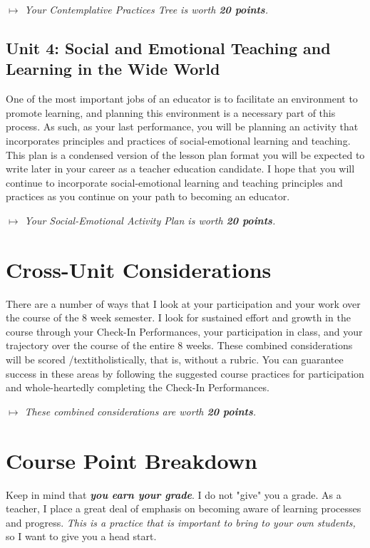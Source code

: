 \documentclass[two-side]{tufte-handout}
\begin{document}
\medskip\noindent\textit{$\mapsto$ Your Contemplative Practices Tree is worth \textbf{20 points}.}

\subsection{Unit 4: Social and Emotional Teaching and Learning in the Wide World}

One of the most important jobs of an educator is to facilitate an environment to promote learning, and planning this environment is a necessary part of this process. As such, as your last performance, you will be planning an activity that incorporates principles and practices of social-emotional learning and teaching. This plan is a condensed version of the lesson plan format you will be expected to write later in your career as a teacher education candidate. I hope that you will continue to incorporate social-emotional learning and teaching principles and practices as you continue on your path to becoming an educator.

\medskip\noindent\textit{$\mapsto$ Your Social-Emotional Activity Plan is worth \textbf{20 points}.}

\section{Cross-Unit Considerations}

There are a number of ways that I look at your participation and your work over the course of the 8 week semester. I look for sustained effort and growth in the course through your Check-In Performances, your participation in class, and your trajectory over the course of the entire 8 weeks. These combined considerations will be scored /textit{holistically}, that is, without a rubric. You can guarantee success in these areas by following the suggested course practices for participation and whole-heartedly completing the Check-In Performances.

\medskip\noindent\textit{$\mapsto$ These combined considerations are worth \textbf{20 points}.}

\section{Course Point Breakdown}

Keep in mind that \emph{\textbf{you earn your grade}}. I do not "give" you a grade. As a teacher, I place a great deal of emphasis on becoming aware of learning processes and progress. \emph{This is a practice that is important to bring to your own students,} so I want to give you a head start.
\end{document}
